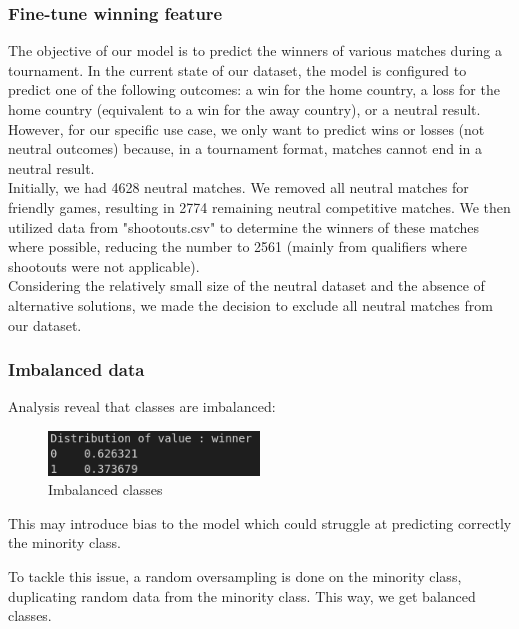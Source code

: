 \documentclass[a4paper,12pt]{article}
\begin{document}
\subsubsection{Fine-tune winning feature}

The objective of our model is to predict the winners of various matches during a tournament. In the current state of our dataset, the model is configured to predict one of the following outcomes: a win for the home country, a loss for the home country (equivalent to a win for the away country), or a neutral result.\\

However, for our specific use case, we only want to predict wins or losses (not neutral outcomes) because, in a tournament format, matches cannot end in a neutral result.\\

Initially, we had 4628 neutral matches. We removed all neutral matches for friendly games, resulting in 2774 remaining neutral competitive matches. We then utilized data from "shootouts.csv" to determine the winners of these matches where possible, reducing the number to 2561 (mainly from qualifiers where shootouts were not applicable).\\

Considering the relatively small size of the neutral dataset and the absence of alternative solutions, we made the decision to exclude all neutral matches from our dataset.

\subsubsection{Imbalanced data}
Analysis reveal that classes are imbalanced: 
\begin{figure}[H]
  \centering
  \includegraphics[width=0.5\textwidth]{./images/imbalanced.png}
  \caption{Imbalanced classes}
  \label{fig:imbalanced}
\end{figure}

This may introduce bias to the model which could struggle at predicting correctly the minority class.

To tackle this issue, a random oversampling is done on the minority class, duplicating random data from the minority class. This way, we get balanced classes. 
\end{document}
